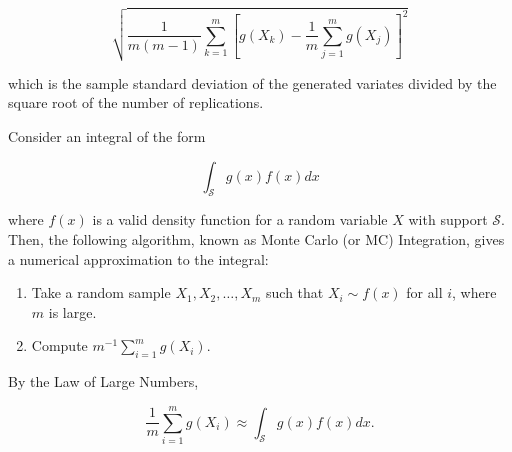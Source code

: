 \documentclass[
  letterpaper,
  DIV=11,
  numbers=noendperiod]{scrreprt}
\providecommand{\tightlist}{%
  \setlength{\itemsep}{0pt}\setlength{\parskip}{0pt}}\usepackage{longtable,booktabs,array}
\theoremstyle{definition}
\theoremstyle{definition}
\theoremstyle{plain}
\theoremstyle{remark}
\begin{document}
\[\sqrt{\frac{1}{m(m-1)} \sum_{k=1}^{m} \left[g\left(X_k\right) - \frac{1}{m} \sum_{j=1}^{m} g\left(X_j\right)\right]^2}\]

which is the sample standard deviation of the generated variates divided
by the square root of the number of replications.

\begin{description}
\tightlist
\item[Monte Carlo Integration (Definition~\ref{def-mc-integration})]
Consider an integral of the form
\end{description}

\[\int_{\mathcal{S}} g(x) f(x) dx\]

where \(f(x)\) is a valid density function for a random variable \(X\)
with support \(\mathcal{S}\). Then, the following algorithm, known as
Monte Carlo (or MC) Integration, gives a numerical approximation to the
integral:

\begin{enumerate}
\def\labelenumi{\arabic{enumi}.}
\tightlist
\item
  Take a random sample \(X_1, X_2, \dotsc, X_m\) such that
  \(X_i \sim f(x)\) for all \(i\), where \(m\) is large.
\item
  Compute \(m^{-1} \sum_{i=1}^{m} g\left(X_i\right)\).
\end{enumerate}

By the Law of Large Numbers,

\[\frac{1}{m} \sum_{i=1}^{m} g\left(X_i\right) \approx \int_{\mathcal{S}} g(x) f(x) dx.\]
\end{document}
